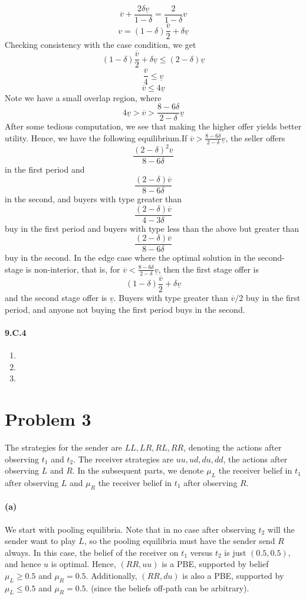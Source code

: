 \documentclass[10pt,letter]{article}
\begin{document}
\begin{enumerate}[label=(\alph*)]
\[ \overline{v} + \frac{2\delta\underline{v}}{1-\delta} = \frac{2}{1-\delta}v \]
\[ v = (1-\delta)\frac{\overline{v}}{2} + \delta\underline{v} \]
Checking consistency with the case condition, we get
\[ (1-\delta)\frac{\overline{v}}{2} + \delta\underline{v} \le (2-\delta) \underline{v}\]
\[ \frac{\overline{v}}{4} \le \underline{v}\]
\[ \overline{v}\le 4\underline{v}\]
Note we have a small overlap region, where
\[ 4 \underline{v} >\overline{v} >\frac{8 - 6\delta}{2-\delta}\underline{v}\]
After some tedious computation, we see that making the higher offer yields better utility. Hence, we have the following equilibrium.If $\overline{v} >\frac{8 - 6\delta}{2-\delta}\underline{v}$, the seller offers
\[ \frac{(2-\delta)^2 \overline{v} }{8 - 6 \delta} \]
in the first period and
\[ \frac{(2-\delta) \overline{v} }{8 - 6 \delta} \]
in the second, and buyers with type greater than
\[ \frac{(2-\delta) \overline{v} }{4 - 3 \delta} \]
buy in the first period and buyers with type less than the above but greater than
\[ \frac{(2-\delta) \overline{v} }{8 - 6 \delta} \]
buy in the second. In the edge case where the optimal solution in the second-stage is non-interior, that is, for $\overline{v} < \frac{8 - 6\delta}{2-\delta}\underline{v}$, then the first stage offer is
\[ (1-\delta)\frac{\overline{v}}{2} + \delta\underline{v} \]
and the second stage offer is $\underline{v}$. Buyers with type greater than $\overline{v}/2$ buy in the first period, and anyone not buying the first period buys in the second.

\end{enumerate}
\paragraph*{9.C.4}
\begin{enumerate}
  \item
  \item
  \item
\end{enumerate}
\section*{Problem 3}
The strategies for the sender are $LL, LR, RL, RR$, denoting the actions after observing $t_1$ and $t_2$. The receiver strategies are $uu, ud, du, dd$, the actions after observing $L$ and $R$. In the subsequent parts, we denote $\mu_L$ the receiver belief in $t_1$ after observing $L$ and $\mu_R$ the receiver belief in $t_1$ after observing $R$.
\paragraph*{(a)}
We start with pooling equilibria. Note that in no case after observing $t_2$ will the sender want to play $L$, so the pooling equilibria must have the sender send $R$ always. In this case, the belief of the receiver on $t_1$ versus $t_2$ is just $(0.5, 0.5)$, and hence $u$ is optimal. Hence, $(RR, uu)$ is a PBE, supported by belief $\mu_L \ge 0.5$ and $\mu_R = 0.5$. Additionally, $(RR, du)$  is also a PBE, supported by $\mu_L \le 0.5$ and $\mu_R = 0.5$. (since the beliefs off-path can be arbitrary).
\end{document}
